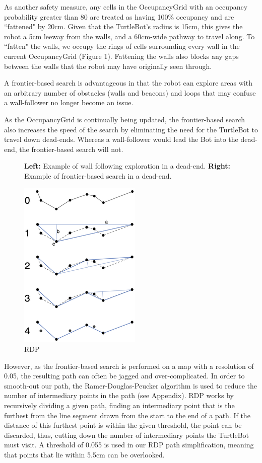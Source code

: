 \documentclass[titlepage,12pt,a4paper]{article}
\begin{document}
As another safety measure, any cells in the OccupancyGrid with an occupancy probability greater than 80 are treated as having 100\% occupancy and are ``fattened" by 20cm. Given that the TurtleBot's radius is 15cm, this gives the robot a 5cm leeway from the walls, and a 60cm-wide pathway to travel along. To ``fatten" the walls, we occupy the rings of cells surrounding every wall in the current OccupancyGrid (Figure 1). Fattening the walls also blocks any gaps between the walls that the robot may have originally seen through. 

A frontier-based search is advantageous in that the robot can explore areas with an arbitrary number of obstacles (walls and beacons) and loops that may confuse a wall-follower no longer become an issue. 

As the OccupancyGrid is continually being updated, the frontier-based search also increases the speed of the search by eliminating the need for the TurtleBot to travel down dead-ends. Whereas a wall-follower would lead the Bot into the dead-end, the frontier-based search will not.

\begin{figure}[h]
	\centering
	\caption{\textbf{Left:} Example of wall following exploration in a dead-end. \textbf{Right:} Example of frontier-based search in a dead-end.}
\end{figure}

\begin{figure}
	\includegraphics[scale=0.5]{rdp.png}
	\caption{RDP}
\end{figure}

However, as the frontier-based search is performed on a map with a resolution of 0.05, the resulting path can often be jagged and over-complicated. In order to smooth-out our path, the Ramer-Douglas-Peucker algorithm is used to reduce the number of intermediary points in the path (see Appendix). RDP works by recursively dividing a given path, finding an intermediary point that is the furthest from the line segment drawn from the start to the end of a path. If the distance of this furthest point is within the given threshold, the point can be discarded, thus, cutting down the number of intermediary points the TurtleBot must visit. A threshold of 0.055 is used in our RDP path simplification, meaning that points that lie within 5.5cm can be overlooked.
\end{document}
